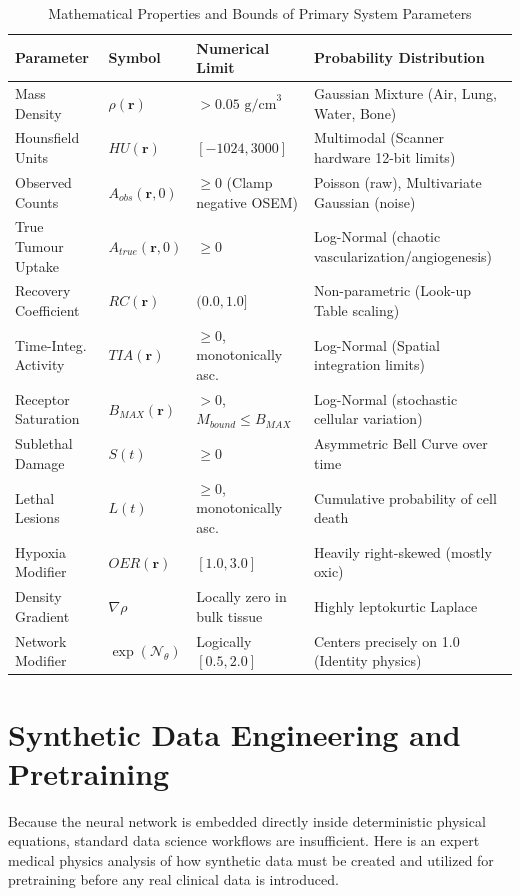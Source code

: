 \documentclass[11pt,a4paper]{article}
\begin{document}
\begin{table}[hbt!]
\centering
\caption{Mathematical Properties and Bounds of Primary System Parameters}
\label{tab:parameter_bounds}
\small
\begin{tabularx}{\textwidth}{@{}l l l X@{}}
\toprule
\textbf{Parameter} & \textbf{Symbol} & \textbf{Numerical Limit} & \textbf{Probability Distribution} \\ \midrule
Mass Density & $\rho(\mathbf{r})$ & $> 0.05 \text{ g/cm}^3$ & Gaussian Mixture (Air, Lung, Water, Bone) \\
Hounsfield Units & $HU(\mathbf{r})$ & $[-1024, 3000]$ & Multimodal (Scanner hardware 12-bit limits) \\
Observed Counts & $A_{obs}(\mathbf{r}, 0)$ & $\ge 0$ (Clamp negative OSEM) & Poisson (raw), Multivariate Gaussian (noise) \\
True Tumour Uptake & $A_{true}(\mathbf{r}, 0)$ & $\ge 0$ & Log-Normal (chaotic vascularization/angiogenesis) \\
Recovery Coefficient & $RC(\mathbf{r})$ & $(0.0, 1.0]$ & Non-parametric (Look-up Table scaling) \\
Time-Integ. Activity & $TIA(\mathbf{r})$ & $\ge 0$, monotonically asc. & Log-Normal (Spatial integration limits) \\
Receptor Saturation & $B_{MAX}(\mathbf{r})$ & $> 0$, $M_{bound} \le B_{MAX}$ & Log-Normal (stochastic cellular variation) \\
Sublethal Damage & $S(t)$ & $\ge 0$ & Asymmetric Bell Curve over time \\
Lethal Lesions & $L(t)$ & $\ge 0$, monotonically asc. & Cumulative probability of cell death \\
Hypoxia Modifier & $OER(\mathbf{r})$ & $[1.0, 3.0]$ & Heavily right-skewed (mostly oxic) \\Density Gradient & $\nabla\rho$ & Locally zero in bulk tissue & Highly leptokurtic Laplace \\
Network Modifier & $\exp(\mathcal{N}_\theta)$ & Logically $[0.5, 2.0]$ & Centers precisely on 1.0 (Identity physics) \\
\bottomrule
\end{tabularx}
\end{table}


\section{Synthetic Data Engineering and Pretraining}

Because the neural network is embedded directly inside deterministic physical equations, standard data science workflows are insufficient. Here is an expert medical physics analysis of how synthetic data must be created and utilized for pretraining before any real clinical data is introduced.
\end{document}
